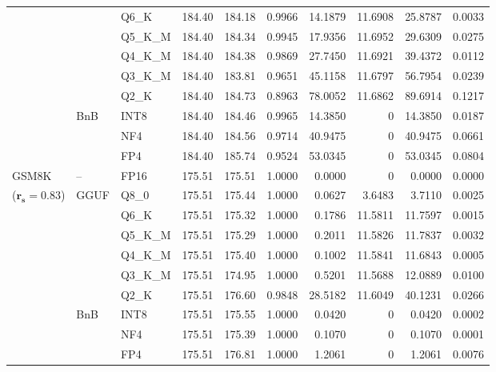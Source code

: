 \begin{longtable}{ll l rrrrrrr}
 &  & Q6\_K & 184.40 & 184.18 & 0.9966 & 14.1879 & 11.6908 & 25.8787 & 0.0033 \\
 &  & Q5\_K\_M & 184.40 & 184.34 & 0.9945 & 17.9356 & 11.6952 & 29.6309 & 0.0275 \\
 &  & Q4\_K\_M & 184.40 & 184.38 & 0.9869 & 27.7450 & 11.6921 & 39.4372 & 0.0112 \\
 &  & Q3\_K\_M & 184.40 & 183.81 & 0.9651 & 45.1158 & 11.6797 & 56.7954 & 0.0239 \\
 &  & Q2\_K & 184.40 & 184.73 & \cellcolor{red!18} 0.8963 & \cellcolor{red!18} 78.0052 & 11.6862 & \cellcolor{red!18} 89.6914 & \cellcolor{red!18} 0.1217 \\
 & BnB & INT8 & 184.40 & 184.46 & 0.9965 & 14.3850 & \cellcolor{cyan!12} $0$ & 14.3850 & 0.0187 \\
 &  & NF4 & 184.40 & 184.56 & 0.9714 & 40.9475 & \cellcolor{cyan!12} $0$ & 40.9475 & 0.0661 \\
 &  & FP4 & 184.40 & 185.74 & 0.9524 & 53.0345 & \cellcolor{cyan!12} $0$ & 53.0345 & 0.0804 \\
\midrule
GSM8K & -- & FP16 & 175.51 & 175.51 & 1.0000 & 0.0000 & \cellcolor{cyan!12} $0$ & 0.0000 & 0.0000 \\
{\small ($\mathbf{r_s{=}0.83}$)} & GGUF & Q8\_0 & 175.51 & 175.44 & 1.0000 & 0.0627 & 3.6483 & 3.7110 & 0.0025 \\
 &  & Q6\_K & 175.51 & 175.32 & 1.0000 & 0.1786 & 11.5811 & 11.7597 & 0.0015 \\
 &  & Q5\_K\_M & 175.51 & 175.29 & 1.0000 & 0.2011 & 11.5826 & 11.7837 & 0.0032 \\
 &  & Q4\_K\_M & 175.51 & 175.40 & 1.0000 & 0.1002 & 11.5841 & 11.6843 & 0.0005 \\
 &  & Q3\_K\_M & 175.51 & 174.95 & 1.0000 & 0.5201 & 11.5688 & 12.0889 & 0.0100 \\
 &  & Q2\_K & 175.51 & 176.60 & 0.9848 & 28.5182 & 11.6049 & 40.1231 & 0.0266 \\
 & BnB & INT8 & 175.51 & 175.55 & 1.0000 & 0.0420 & \cellcolor{cyan!12} $0$ & 0.0420 & 0.0002 \\
 &  & NF4 & 175.51 & 175.39 & 1.0000 & 0.1070 & \cellcolor{cyan!12} $0$ & 0.1070 & 0.0001 \\
 &  & FP4 & 175.51 & 176.81 & 1.0000 & 1.2061 & \cellcolor{cyan!12} $0$ & 1.2061 & 0.0076 \\
\end{longtable}
\endgroup